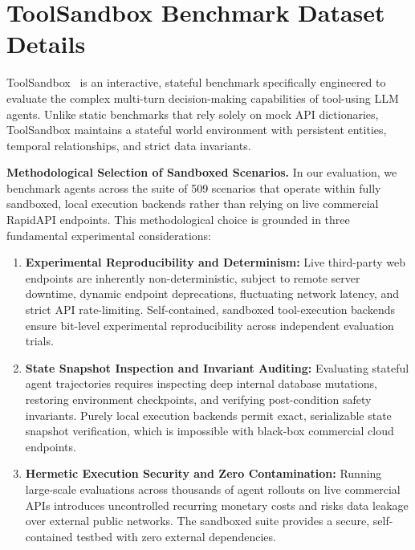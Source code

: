 \section{ToolSandbox Benchmark Dataset Details}
\label{app:dataset_stats}

ToolSandbox~\citep{gu2024toolsandbox} is an interactive, stateful benchmark specifically engineered to evaluate the complex multi-turn decision-making capabilities of tool-using LLM agents. Unlike static benchmarks that rely solely on mock API dictionaries, ToolSandbox maintains a stateful world environment with persistent entities, temporal relationships, and strict data invariants.



\textbf{Methodological Selection of Sandboxed Scenarios.} In our evaluation, we benchmark agents across the suite of 509 scenarios that operate within fully sandboxed, local execution backends rather than relying on live commercial RapidAPI endpoints. This methodological choice is grounded in three fundamental experimental considerations:
\begin{enumerate}[leftmargin=*,itemsep=2pt,topsep=2pt]
    \item \textbf{Experimental Reproducibility and Determinism:} Live third-party web endpoints are inherently non-deterministic, subject to remote server downtime, dynamic endpoint deprecations, fluctuating network latency, and strict API rate-limiting. Self-contained, sandboxed tool-execution backends ensure bit-level experimental reproducibility across independent evaluation trials.
    \item \textbf{State Snapshot Inspection and Invariant Auditing:} Evaluating stateful agent trajectories requires inspecting deep internal database mutations, restoring environment checkpoints, and verifying post-condition safety invariants. Purely local execution backends permit exact, serializable state snapshot verification, which is impossible with black-box commercial cloud endpoints.
    \item \textbf{Hermetic Execution Security and Zero Contamination:} Running large-scale evaluations across thousands of agent rollouts on live commercial APIs introduces uncontrolled recurring monetary costs and risks data leakage over external public networks. The sandboxed suite provides a secure, self-contained testbed with zero external dependencies.
\end{enumerate}

